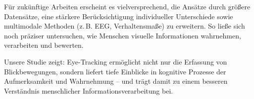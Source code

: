\documentclass[
    language=german, %
    thesis=seminar, %
    supervisor=postdoc, %
    multiauthor=true, %
    ]{settings/csssa-thesis}
\begin{document}
Für zukünftige Arbeiten erscheint es vielversprechend, die Ansätze durch größere Datensätze, 
eine stärkere Berücksichtigung individueller Unterschiede sowie multimodale Methoden (z.\,B. EEG, 
Verhaltensmaße) zu erweitern. So ließe sich noch präziser untersuchen, wie Menschen visuelle 
Informationen wahrnehmen, verarbeiten und bewerten.  

Unsere Studie zeigt: Eye-Tracking ermöglicht nicht nur die Erfassung von Blickbewegungen, 
sondern liefert tiefe Einblicke in kognitive Prozesse der Aufmerksamkeit und Wahrnehmung – 
und trägt damit zu einem besseren Verständnis menschlicher Informationsverarbeitung bei. 


\newpage
\printbibliography[heading=header]

\end{document}
